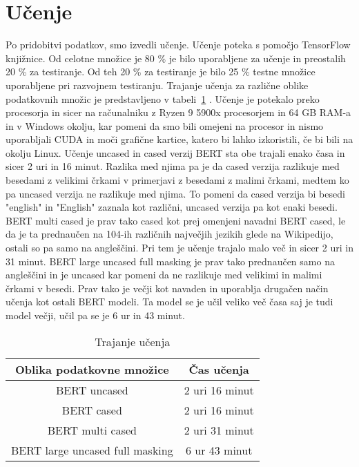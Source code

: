 \documentclass[sigconf,nonacm]{acmart}
\begin{document}
\section{Učenje}
Po pridobitvi podatkov, smo izvedli učenje. Učenje poteka s pomočjo TensorFlow knjižnice. Od celotne množice je 80 \% je bilo uporabljene za učenje in preostalih 20 \% za testiranje. Od teh 20 \% za testiranje je bilo 25 \% testne množice uporabljene pri razvojnem testiranju. Trajanje učenja za različne oblike podatkovnih množic je predstavljeno v tabeli~\ref{tab:table1} . Učenje je potekalo preko procesorja in sicer na računalniku z Ryzen 9 5900x procesorjem in 64 GB RAM-a in v Windows okolju, kar pomeni da smo bili omejeni na procesor in nismo uporabljali CUDA in moči grafične kartice, katero bi lahko izkoristili, če bi bili na okolju Linux. Učenje uncased in cased verzij BERT sta obe trajali enako časa in sicer 2 uri in 16 minut. Razlika med njima pa je da cased verzija razlikuje med besedami z velikimi črkami v primerjavi z besedami z malimi črkami, medtem ko pa uncased verzija ne razlikuje med njima. To pomeni da cased verzija bi besedi "english" in "English" zaznala kot različni, uncased verzija pa kot enaki besedi. BERT multi cased je prav tako cased kot prej omenjeni navadni BERT cased, le da je  ta prednaučen na 104-ih različnih največjih jezikih glede na Wikipedijo, ostali so pa samo na angleščini. Pri tem je učenje trajalo malo več in sicer 2 uri in 31 minut. BERT large uncased full masking je prav tako prednaučen samo na angleščini  in je uncased kar pomeni da ne razlikuje med velikimi in malimi črkami v besedi. Prav tako je večji kot navaden in uporablja drugačen način učenja kot ostali BERT modeli. Ta model se je učil veliko več časa saj je tudi model večji, učil pa se je 6 ur in 43 minut.

\begin{table}
    \centering
    \caption{Trajanje učenja}
    \label{tab:table1}
    \begin{tabular}{cc}
        	\toprule
        	Oblika podatkovne množice&Čas učenja \\
       	 \midrule
        	BERT uncased & 2 uri 16 minut \\
       	BERT cased &  2 uri 16 minut\\
	BERT multi cased & 2 uri 31 minut \\
	BERT large uncased full masking  &  6 ur 43 minut\\
       	 \bottomrule
    \end{tabular}
\end{table}
\end{document}
